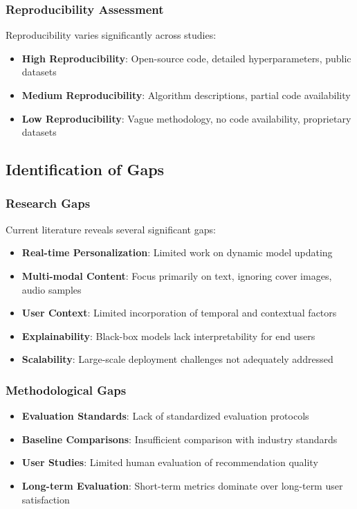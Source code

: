 \documentclass[12pt,a4paper]{article}
\begin{document}
\subsubsection{Reproducibility Assessment}
Reproducibility varies significantly across studies:
\begin{itemize}
    \item \textbf{High Reproducibility}: Open-source code, detailed hyperparameters, public datasets
    \item \textbf{Medium Reproducibility}: Algorithm descriptions, partial code availability
    \item \textbf{Low Reproducibility}: Vague methodology, no code availability, proprietary datasets
\end{itemize}

\subsection{Identification of Gaps}

\subsubsection{Research Gaps}
Current literature reveals several significant gaps:
\begin{itemize}
    \item \textbf{Real-time Personalization}: Limited work on dynamic model updating
    \item \textbf{Multi-modal Content}: Focus primarily on text, ignoring cover images, audio samples
    \item \textbf{User Context}: Limited incorporation of temporal and contextual factors
    \item \textbf{Explainability}: Black-box models lack interpretability for end users
    \item \textbf{Scalability}: Large-scale deployment challenges not adequately addressed
\end{itemize}

\subsubsection{Methodological Gaps}
\begin{itemize}
    \item \textbf{Evaluation Standards}: Lack of standardized evaluation protocols
    \item \textbf{Baseline Comparisons}: Insufficient comparison with industry standards
    \item \textbf{User Studies}: Limited human evaluation of recommendation quality
    \item \textbf{Long-term Evaluation}: Short-term metrics dominate over long-term user satisfaction
\end{itemize}
\end{document}
